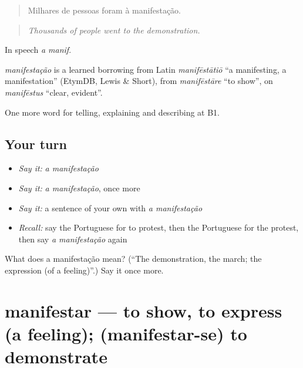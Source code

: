 \begin{quote}
Milhares de pessoas foram à manifestação.
\end{quote}

\begin{quote}
\emph{Thousands of people went to the demonstration.}
\end{quote}

In speech \emph{a manif}.

\begin{cousinweb}
\emph{manifestação} is a learned borrowing from Latin \emph{manifēstātiō} \textquotedblleft{}a manifesting, a manifestation\textquotedblright{} (EtymDB, Lewis \& Short), from \emph{manifēstāre} \textquotedblleft{}to show\textquotedblright{}, on \emph{manifēstus} \textquotedblleft{}clear, evident\textquotedblright{}.
\end{cousinweb}

\begin{grammarlens}[title={What you've built}]
One more word for telling, explaining and describing at B1.
\end{grammarlens}

\subsection*{Your turn}
\begin{itemize}
\raggedright
  \item \emph{Say it:} \emph{a manifestação}
  \item \emph{Say it:} \emph{a manifestação}, once more
  \item \emph{Say it:} a sentence of your own with \emph{a manifestação}
  \item \emph{Recall:} say the Portuguese for to protest, then the Portuguese for the protest, then say \emph{a manifestação} again
\end{itemize}

\begin{tcolorbox}[breakable,colback=teal!4,colframe=teal!35!black,title={Before you move on}]
What does a manifestação mean? (\textquotedblleft{}The demonstration, the march; the expression (of a feeling)\textquotedblright{}.) Say it once more.
\end{tcolorbox}
\section[manifestar]{manifestar — to show, to express (a feeling); (manifestar-se) to demonstrate}

